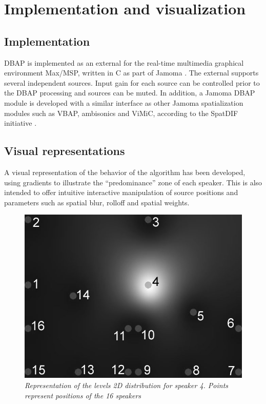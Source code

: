 \documentclass[twoside,10pt]{article}
\begin{document}
\section{Implementation and visualization}

\subsection{Implementation}
\label{sec:implementation}

DBAP is implemented as an external for the real-time multimedia graphical environment Max/MSP, written in C as part of Jamoma \cite{Place:2006jamoma}. The external supports several independent sources. Input gain for each source can be controlled prior to the DBAP processing and sources can be muted.  In addition, a Jamoma DBAP module is developed with a similar interface as other Jamoma spatialization modules such as VBAP, ambisonics and ViMiC, according to the SpatDIF initiative \cite{Peters:2008spatdif}.



\subsection{Visual representations}
\label{sec:visual_representation}


A visual representation of the behavior of the algorithm has been developed, using gradients to illustrate the ``predominance'' zone of each speaker. This is also intended to offer intuitive interactive manipulation of source positions and parameters such as spatial blur, rolloff and spatial weights.

\begin{figure}[ht]
\centerline{\includegraphics[scale=0.5]{spk4_r_6_b_0+nbrs}}
\caption{{\it Representation of the levels 2D distribution for speaker 4. %
Points represent positions of the 16 speakers}}  
\label{fig:1spk}
\end{figure}
\end{document}
